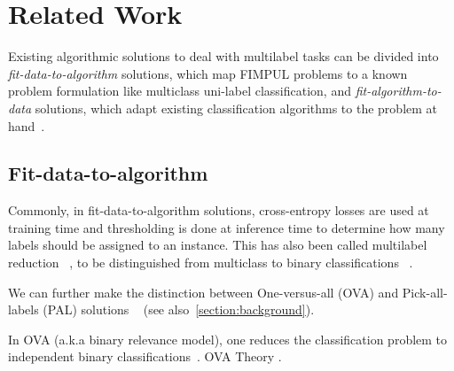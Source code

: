 
\section{Related Work}
\label{sec:org2aceb9f}


Existing algorithmic solutions to deal with multilabel tasks can be divided into \emph{fit-data-to-algorithm} solutions, which map FIMPUL problems to a known problem formulation like multiclass uni-label classification, and \emph{fit-algorithm-to-data} solutions, which adapt existing classification
algorithms to the problem at hand~\citep{multilabelMethods}.

\subsection{Fit-data-to-algorithm}
Commonly, in fit-data-to-algorithm solutions, cross-entropy losses are used at training time and thresholding is done at inference time to determine how many labels should be assigned to an instance. This has also been called multilabel reduction ~\citep{multilabelReduction}, to be distinguished from multiclass to binary classifications ~\citep{multiclassToBinary1, multiclassToBinary2, multiclassToBinary3}.

We can further make the distinction between One-versus-all (OVA) and Pick-all-labels (PAL) solutions ~\citep{multilabelReduction} (see also~\ref{section:background}).

In OVA (a.k.a binary relevance model), one reduces the classification problem to independent binary classifications~\citep{OVA1, hammingLoss, OVA2}. OVA Theory \cite{OVATheory}.

